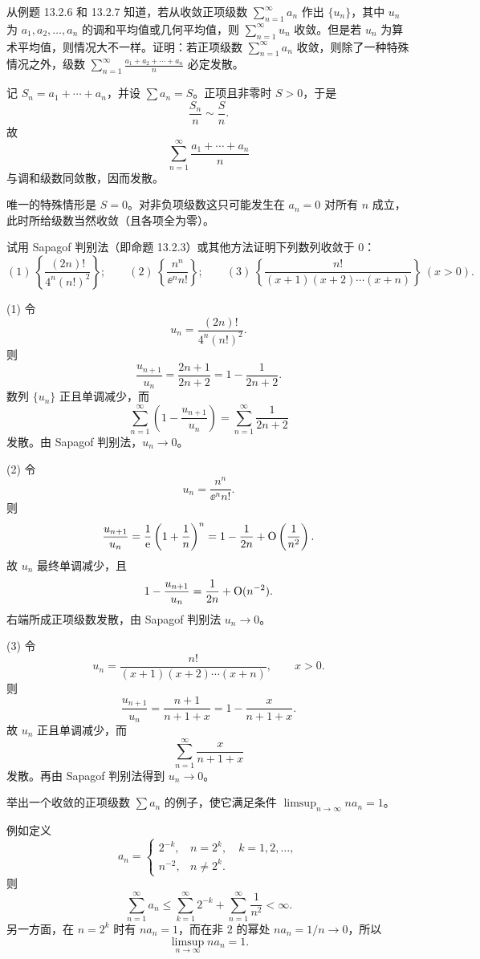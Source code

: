 \begin{xexercise}[4]
从例题 13.2.6 和 13.2.7 知道，若从收敛正项级数 $\sum_{n=1}^{\infty}a_n$ 作出 $\{u_n\}$，其中 $u_n$ 为 $a_1,a_2,\ldots,a_n$ 的调和平均值或几何平均值，则 $\sum_{n=1}^{\infty}u_n$ 收敛。但是若 $u_n$ 为算术平均值，则情况大不一样。证明：若正项级数 $\sum_{n=1}^{\infty}a_n$ 收敛，则除了一种特殊情况之外，级数 $\sum_{n=1}^{\infty}\frac{a_1+a_2+\cdots+a_n}{n}$ 必定发散。
\end{xexercise}
\begin{xsolution}
记 $S_n=a_1+\cdots+a_n$，并设 $\sum a_n=S$。正项且非零时 $S>0$，于是
\[
 \frac{S_n}{n}\sim\frac S n.
\]
故
\[
 \sum_{n=1}^{\infty}\frac{a_1+\cdots+a_n}{n}
\]
与调和级数同敛散，因而发散。

唯一的特殊情形是 $S=0$。对非负项级数这只可能发生在 $a_n=0$ 对所有 $n$ 成立，此时所给级数当然收敛（且各项全为零）。
\end{xsolution}


\begin{xexercise}[5]
试用 Sapagof 判别法（即命题 13.2.3）或其他方法证明下列数列收敛于 0：
\[
(1)\ \left\{\frac{(2n)!}{4^n(n!)^2}\right\};\qquad
(2)\ \left\{\frac{n^n}{\ee^n n!}\right\};\qquad
(3)\ \left\{\frac{n!}{(x+1)(x+2)\cdots(x+n)}\right\}\ (x>0).
\]
\end{xexercise}
\begin{xsolution}
(1) 令
\[
 u_n=\frac{(2n)!}{4^n(n!)^2}.
\]
则
\[
 \frac{u_{n+1}}{u_n}=\frac{2n+1}{2n+2}
 =1-\frac1{2n+2}.
\]
数列 $\{u_n\}$ 正且单调减少，而
\[
 \sum_{n=1}^{\infty}\left(1-\frac{u_{n+1}}{u_n}\right)
 =\sum_{n=1}^{\infty}\frac1{2n+2}
\]
发散。由 Sapagof 判别法，$u_n\to0$。

(2) 令
\[
 u_n=\frac{n^n}{\ee^n n!}.
\]
则
\[
 \frac{u_{n+1}}{u_n}
 =\frac1{\mathrm{e}}\left(1+\frac1n\right)^n
 =1-\frac1{2n}+\mathrm{O}\left(\frac1{n^2}\right).
\]
故 $u_n$ 最终单调减少，且
\[
 1-\frac{u_{n+1}}{u_n}
 =\frac1{2n}+\mathrm{O}(n^{-2}).
\]
右端所成正项级数发散，由 Sapagof 判别法 $u_n\to0$。

(3) 令
\[
 u_n=\frac{n!}{(x+1)(x+2)\cdots(x+n)},\qquad x>0.
\]
则
\[
 \frac{u_{n+1}}{u_n}=\frac{n+1}{n+1+x}
 =1-\frac{x}{n+1+x}.
\]
故 $u_n$ 正且单调减少，而
\[
 \sum_{n=1}^{\infty}\frac{x}{n+1+x}
\]
发散。再由 Sapagof 判别法得到 $u_n\to0$。
\end{xsolution}


\begin{xexercise}[6]
举出一个收敛的正项级数 $\sum a_n$ 的例子，使它满足条件 $\limsup_{n\to\infty}na_n=1$。
\end{xexercise}
\begin{xsolution}
例如定义
\[
 a_n=\begin{cases}
 2^{-k},&n=2^k,\quad k=1,2,\ldots,\\
 n^{-2},&n\neq2^k.
 \end{cases}
\]
则
\[
 \sum_{n=1}^{\infty}a_n
 \leq\sum_{k=1}^{\infty}2^{-k}+\sum_{n=1}^{\infty}\frac1{n^2}<\infty.
\]
另一方面，在 $n=2^k$ 时有 $na_n=1$，而在非 $2$ 的幂处 $na_n=1/n\to0$，所以
\[
 \limsup_{n\to\infty}na_n=1.
\]
\end{xsolution}



